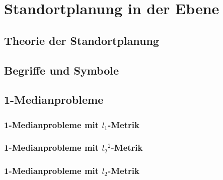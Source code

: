 \chapter{Standortplanung in der Ebene} %
\label{cha:standortplanung_in_der_ebene}


  \label{sec:standortplanung_in_der_ebene}

    \section{Theorie der Standortplanung} %
    \label{sec:theorie_der_standortplanung}
    

    \section{Begriffe und Symbole} %
    \label{sec:begriffe_und_symbole}
    

    \section{1-Medianprobleme} %
    \label{sec:1_medianprobleme}

      \subsection{1-Medianprobleme mit $l_1$-Metrik} %
      \label{sub:1_medianprobleme_mit_l1_Metrik}
      

      \subsection{1-Medianprobleme mit ${l_2}^{2}$-Metrik} %
      \label{sub:1_medianprobleme_mit_l2^2_Metrik}
      

      \subsection{1-Medianprobleme mit $l_2$-Metrik} %
      \label{sub:1_medianprobleme_mit_l2_Metrik}
      
    
